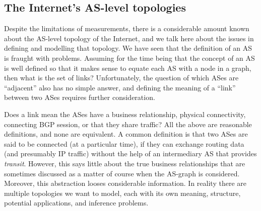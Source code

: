 \subsection{The Internet's AS-level topologies}

Despite the limitations of measurements, there is a considerable
amount known about the AS-level topology of the Internet, and we talk
here about the issues in defining and modelling that topology.  We
have seen that the definition of an AS is fraught with
problems. Assuming for the time being that the concept of an AS is
well defined so that it makes sense to equate each AS with a node in a
graph, then what is the set of links?  Unfortunately, the question of
which ASes are ``adjacent'' also has no simple answer, and defining
the meaning of a ``link'' between two ASes requires further
consideration.

Does a link mean the ASes have a business relationship, physical
connectivity, connecting BGP session, or that they share traffic? All
the above are reasonable definitions, and none are equivalent. A
common definition is that two ASes are said to be connected (at a
particular time), if they can exchange routing data (and presumably IP
traffic) without the help of an intermediary AS that provides {\em
  transit}. However, this says little about the true business
relationships that are sometimes discussed as a matter of course when
the AS-graph is considered. Moreover, this abstraction looses
considerable information. In reality there are multiple topologies we
want to model, each with its own meaning, structure, potential
applications, and inference problems.

